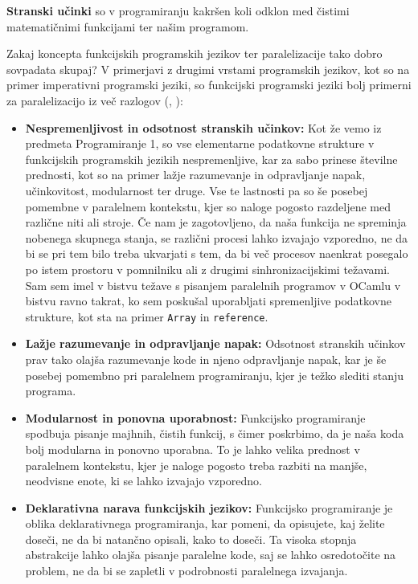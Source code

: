 \documentclass[mat1, tisk]{fmfdelo}
\begin{document}
\begin{definicija}
  \textbf{Stranski učinki} so v programiranju kakršen koli odklon med čistimi matematičnimi funkcijami ter našim programom.
\end{definicija}

Zakaj koncepta funkcijskih programskih jezikov ter paralelizacije tako dobro sovpadata skupaj?
V primerjavi z drugimi vrstami programskih jezikov, kot so na primer imperativni programski jeziki,
so funkcijski programski jeziki bolj primerni za paralelizacijo iz več razlogov 
(\cite{parallelisation_advantages_stack_discussion_2023}, \cite{functional_parallel_graph_rewriting}):

\begin{itemize} \label{itemize:prednosti_funkcijskega_programiranja}
  \item \textbf{Nespremenljivost in odsotnost stranskih učinkov:} 
    Kot že vemo iz predmeta Programiranje 1, so vse 
    elementarne podatkovne strukture v funkcijskih programskih jezikih nespremenljive, kar za sabo prinese številne
    prednosti, kot so na primer lažje razumevanje in odpravljanje napak, učinkovitost, modularnost 
    ter druge. Vse te lastnosti pa so še posebej pomembne v paralelnem kontekstu, kjer so naloge pogosto razdeljene med
    različne niti ali stroje. Če nam je zagotovljeno, da naša funkcija ne spreminja nobenega skupnega stanja, se
    različni procesi lahko izvajajo vzporedno, ne da bi se pri tem bilo treba ukvarjati s tem, da bi več procesov
    naenkrat posegalo po istem prostoru v pomnilniku ali z drugimi sinhronizacijskimi težavami.
    Sam sem imel v bistvu težave s pisanjem paralelnih programov v OCamlu v bistvu ravno takrat, ko sem
    poskušal uporabljati spremenljive podatkovne strukture, kot sta na primer \texttt{Array} in \texttt{reference}.

  \item \textbf{Lažje razumevanje in odpravljanje napak:} 
    Odsotnost stranskih učinkov prav tako olajša razumevanje kode in njeno odpravljanje napak, kar je še posebej
    pomembno pri paralelnem programiranju, kjer je težko slediti stanju programa.

  \item \textbf{Modularnost in ponovna uporabnost:}
    Funkcijsko programiranje spodbuja pisanje majhnih, čistih funkcij, s čimer poskrbimo, da je naša koda bolj 
    modularna in ponovno uporabna. To je lahko velika prednost v paralelnem kontekstu,
    kjer je naloge pogosto treba razbiti na manjše, neodvisne enote, ki se lahko izvajajo vzporedno.

  \item \textbf{Deklarativna narava funkcijskih jezikov:} 
    Funkcijsko programiranje je oblika deklarativnega programiranja, kar pomeni, da opisujete, kaj želite doseči, 
    ne da bi natančno opisali, kako to doseči. Ta visoka stopnja abstrakcije lahko olajša pisanje paralelne kode, 
    saj se lahko osredotočite na problem, ne da bi se zapletli v podrobnosti paralelnega izvajanja.
\end{itemize}
\end{document}
